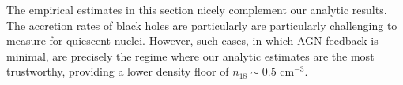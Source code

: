 \documentclass[usenatbib,fleqn]{mnras}
\newcommand\lsim{\mathrel{\rlap{\lower4pt\hbox{\hskip1pt$\sim$}}
    \raise1pt\hbox{$<$}}}
\newcommand\gsim{\mathrel{\rlap{\lower4pt\hbox{\hskip1pt$\sim$}}
    \raise1pt\hbox{$>$}}}
\newcommand{\Mbh}[1][]{M_{\bullet1}}
\newcommand{\Msun}{{\rm M_\odot}}
\begin{document}



The empirical estimates in this section
nicely complement our analytic results.  The accretion rates of black holes are particularly are particularly challenging to measure for quiescent nuclei.  However, such cases, in which AGN feedback is minimal, are
precisely the regime where our analytic estimates are the most trustworthy, providing a lower density floor of $n_{18} \sim 0.5$
cm$^{-3}$.




\end{document}
